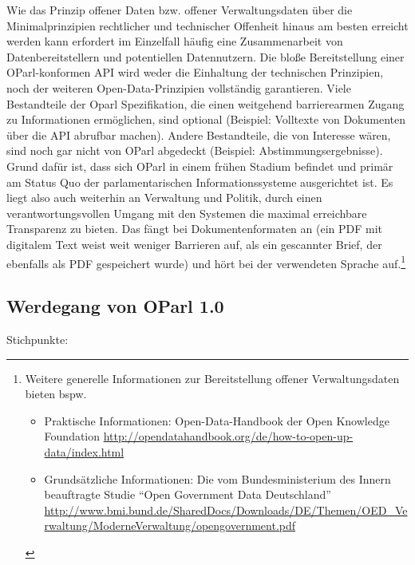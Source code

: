 \documentclass[,a4paper]{article}
\begin{document}
Wie das Prinzip offener Daten bzw. offener Verwaltungsdaten über die
Minimalprinzipien rechtlicher und technischer Offenheit hinaus am besten
erreicht werden kann erfordert im Einzelfall häufig eine Zusammenarbeit
von Datenbereitstellern und potentiellen Datennutzern. Die bloße
Bereitstellung einer OParl-konformen API wird weder die Einhaltung der
technischen Prinzipien, noch der weiteren Open-Data-Prinzipien
vollständig garantieren. Viele Bestandteile der Oparl Spezifikation, die
einen weitgehend barrierearmen Zugang zu Informationen ermöglichen, sind
optional (Beispiel: Volltexte von Dokumenten über die API abrufbar
machen). Andere Bestandteile, die von Interesse wären, sind noch gar
nicht von OParl abgedeckt (Beispiel: Abstimmungsergebnisse). Grund dafür
ist, dass sich OParl in einem frühen Stadium befindet und primär am
Status Quo der parlamentarischen Informationssysteme ausgerichtet ist.
Es liegt also auch weiterhin an Verwaltung und Politik, durch einen
verantwortungsvollen Umgang mit den Systemen die maximal erreichbare
Transparenz zu bieten. Das fängt bei Dokumentenformaten an (ein PDF mit
digitalem Text weist weit weniger Barrieren auf, als ein gescannter
Brief, der ebenfalls als PDF gespeichert wurde) und hört bei der
verwendeten Sprache auf.\footnote{Weitere generelle Informationen zur
  Bereitstellung offener Verwaltungsdaten bieten bspw.

  \begin{itemize}
  \itemsep1pt\parskip0pt
  \item
    Praktische Informationen: Open-Data-Handbook der Open Knowledge
    Foundation
    \url{http://opendatahandbook.org/de/how-to-open-up-data/index.html}
  \item
    Grundsätzliche Informationen: Die vom Bundesministerium des Innern
    beauftragte Studie ``Open Government Data Deutschland''
    \url{http://www.bmi.bund.de/SharedDocs/Downloads/DE/Themen/OED_Verwaltung/ModerneVerwaltung/opengovernment.pdf}
  \end{itemize}}

\subsection{Werdegang von OParl 1.0}\label{werdegang-von-oparl-1.0}

Stichpunkte:
\end{document}
